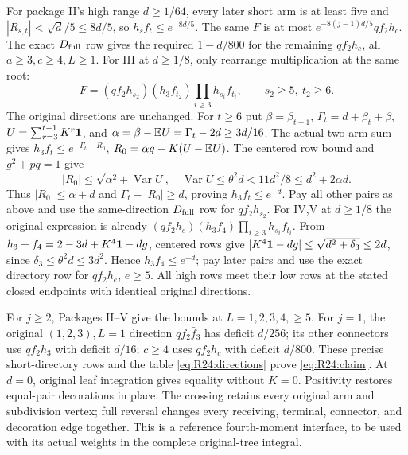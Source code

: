 For package II's high range $d\ge1/64$, every later short arm is at
least five and
$|R_{s,t}|<\sqrt d/5\le8d/5$, so $h_sf_t\le e^{-8d/5}$.
The same $F$ is at most $e^{-8(j-1)d/5}qf_2h_c$.
The exact $D_{\rm full}$ row gives the required $1-d/800$ for the
remaining $qf_2h_c$, all $a\ge3,c\ge4,L\ge1$.
For III at $d\ge1/8$, only rearrange multiplication at the same root:
\[
F=(qf_2h_{s_2})(h_3f_{t_2})\prod_{i\ge3}h_{s_i}f_{t_i},
\qquad s_2\ge5,\ t_2\ge6.
\]
The original directions are unchanged. For $t\ge6$ put
$\beta=\beta_{t-1}$, $\Gamma_t=d+\beta_t+\beta$,
$U=\sum_{r=3}^{t-1}K^r\mathbf1$, and
$\alpha=\beta-\mathbb E U=\Gamma_t-2d\ge3d/16$.
The actual two-arm sum gives
$h_3f_t\le e^{-\Gamma_t-R_0}$,
$R_0=\alpha g-K(U-\mathbb E U)$.
The centered row bound and $g^2+pq=1$ give
\[
|R_0|\le\sqrt{\alpha^2+\operatorname{Var}U},\quad
\operatorname{Var}U\le\theta^2d<11d^2/8\le d^2+2\alpha d.
\]
Thus $|R_0|\le\alpha+d$ and $\Gamma_t-|R_0|\ge d$,
proving $h_3f_t\le e^{-d}$.
Pay all other pairs as above and use the same-direction
$D_{\rm full}$ row for $qf_2h_{s_2}$.
For IV,V at $d\ge1/8$ the original expression is already
$(qf_2h_e)(h_3f_4)\prod_{i\ge3}h_{s_i}f_{t_i}$.
From $h_3+f_4=2-3d+K^4\mathbf1-dg$, centered rows give
$|K^4\mathbf1-dg|\le\sqrt{d^2+\delta_3}\le2d$,
since $\delta_3\le\theta^2d\le3d^2$.
Hence $h_3f_4\le e^{-d}$; pay later pairs and use the exact directory
row for $qf_2h_e$, $e\ge5$. All high rows meet their low rows at the
stated closed endpoints with identical original directions.

For $j\ge2$, Packages II--V give the bounds at $L=1,2,3,4,\ge5$.
For $j=1$, the original $(1,2,3),L=1$ direction $qf_2\bar f_3$ has
deficit $d/256$; its other connectors use $qf_2h_3$ with deficit $d/16$;
$c\ge4$ uses $qf_2h_c$ with deficit $d/800$.
These precise short-directory rows and the table
\eqref{eq:R24:directions} prove \eqref{eq:R24:claim}.
At $d=0$, original leaf integration gives equality without $K=0$.
Positivity restores equal-pair decorations in place. The crossing
retains every original arm and subdivision vertex; full reversal
changes every receiving, terminal, connector, and decoration edge
together. This is a reference fourth-moment interface, to be used
with its actual weights in the complete original-tree integral.

